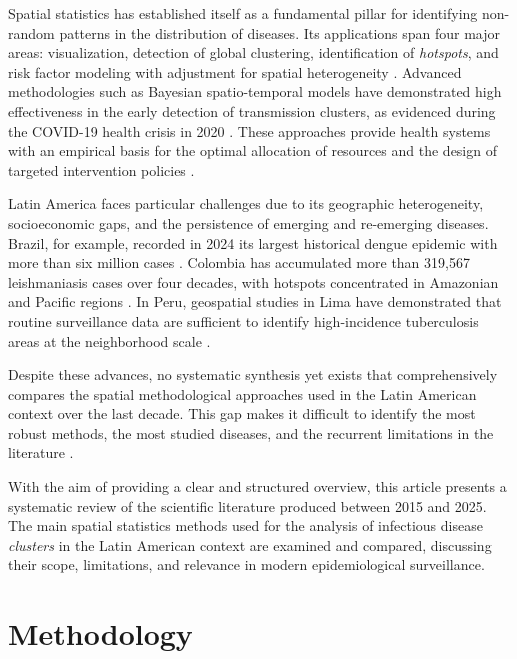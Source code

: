 \documentclass[conference]{IEEEtran}
\begin{document}
Spatial statistics has established itself as a fundamental
pillar for identifying non-random patterns in the distribution
of diseases. Its applications span four major areas:
visualization, detection of global clustering, identification
of \textit{hotspots}, and risk factor modeling with adjustment
for spatial heterogeneity \cite{Lin2022}. Advanced
methodologies such as Bayesian spatio-temporal models have
demonstrated high effectiveness in the early detection of
transmission clusters, as evidenced during the COVID-19
health crisis in 2020 \cite{Zhu2022, Chen2022}. These
approaches provide health systems with an empirical basis for
the optimal allocation of resources and the design of
targeted intervention policies \cite{LevinRector2024}.

Latin America faces particular challenges due to its
geographic heterogeneity, socioeconomic gaps, and the
persistence of emerging and re-emerging diseases. Brazil, for
example, recorded in 2024 its largest historical dengue
epidemic with more than six million cases \cite{Sena2025}.
Colombia has accumulated more than 319,567 leishmaniasis cases
over four decades, with hotspots concentrated in Amazonian and
Pacific regions \cite{Leishmaniasis2025}. In Peru, geospatial
studies in Lima have demonstrated that routine surveillance
data are sufficient to identify high-incidence tuberculosis
areas at the neighborhood scale \cite{Brooks2022}.

Despite these advances, no systematic synthesis yet exists
that comprehensively compares the spatial methodological
approaches used in the Latin American context over the last
decade. This gap makes it difficult to identify the most
robust methods, the most studied diseases, and the recurrent
limitations in the literature \cite{Delmelle2023,
Habereder2025}.

With the aim of providing a clear and structured overview,
this article presents a systematic review of the scientific
literature produced between 2015 and 2025. The main spatial
statistics methods used for the analysis of infectious disease
\textit{clusters} in the Latin American context are examined
and compared, discussing their scope, limitations, and
relevance in modern epidemiological surveillance.

\section{Methodology}
\end{document}
